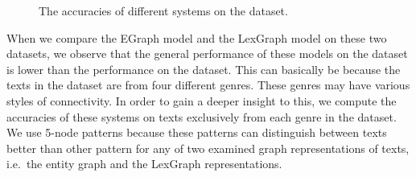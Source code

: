 \begin{figure}[!ht]
  \begin{center}
      \mydata
  \end{center}
  \caption{The accuracies of different systems on the \declercqds dataset.}
  \label{fig:declercq-ds}
\end{figure}

When we compare the EGraph model and the LexGraph model on these two datasets, we observe that the general performance of these models on the \declercqds dataset is lower than the performance on the \pitlerds dataset. 
This can basically be because the texts in the \declercqds dataset are from four different genres. These genres may have various styles of connectivity.  
In order to gain a deeper insight to this, we compute the accuracies of these systems on texts exclusively from each genre in the \declercqds dataset. 
We use 5-node patterns because these patterns can distinguish between texts better than other pattern for any of two examined graph representations of texts, i.e.\ the entity graph and the \mbox{LexGraph} representations. 

